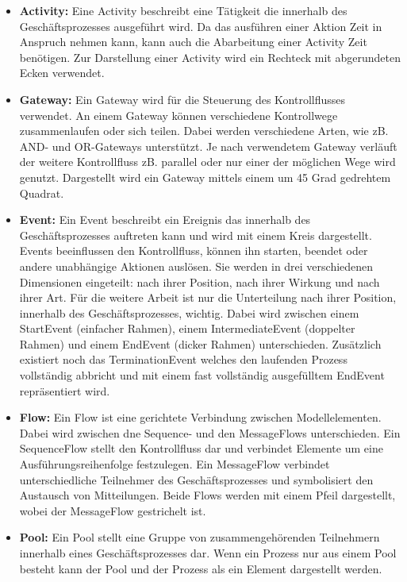 \begin{itemize}
    \item \textbf{Activity:} 
    Eine Activity beschreibt eine Tätigkeit die innerhalb des Geschäftsprozesses ausgeführt wird.
    Da das ausführen einer Aktion Zeit in Anspruch nehmen kann, kann auch die Abarbeitung einer Activity Zeit benötigen.
    Zur Darstellung einer Activity wird ein Rechteck mit abgerundeten Ecken verwendet.
    \item \textbf{Gateway:}
    Ein Gateway wird für die Steuerung des Kontrollflusses verwendet. 
    An einem Gateway können verschiedene Kontrollwege zusammenlaufen oder sich teilen. 
    Dabei werden verschiedene Arten, wie zB. AND- und OR-Gateways unterstützt. 
    Je nach verwendetem Gateway verläuft der weitere Kontrollfluss zB. parallel oder nur einer der möglichen Wege wird genutzt.
    Dargestellt wird ein Gateway mittels einem um 45 Grad gedrehtem Quadrat. 
    \item \textbf{Event:}
    Ein Event beschreibt ein Ereignis das innerhalb des Geschäftsprozesses auftreten kann und wird mit einem Kreis dargestellt.
    Events beeinflussen den Kontrollfluss, können ihn starten, beendet oder andere unabhängige Aktionen auslösen.
    Sie werden in drei verschiedenen Dimensionen eingeteilt: nach ihrer Position, nach ihrer Wirkung und nach ihrer Art.
    Für die weitere Arbeit ist nur die Unterteilung nach ihrer Position, innerhalb des Geschäftsprozesses, wichtig.
    Dabei wird zwischen einem StartEvent (einfacher Rahmen), einem IntermediateEvent (doppelter Rahmen) und einem EndEvent (dicker Rahmen) unterschieden.
    Zusätzlich existiert noch das TerminationEvent welches den laufenden Prozess vollständig abbricht und mit einem fast vollständig ausgefülltem EndEvent repräsentiert wird.
    \item \textbf{Flow:}
    Ein Flow ist eine gerichtete Verbindung zwischen Modellelementen.
    Dabei wird zwischen dne Sequence- und den MessageFlows unterschieden.
    Ein SequenceFlow stellt den Kontrollfluss dar und verbindet Elemente um eine Ausführungsreihenfolge festzulegen.
    Ein MessageFlow verbindet unterschiedliche Teilnehmer des Geschäftsprozesses und symbolisiert den Austausch von Mitteilungen.
    Beide Flows werden mit einem Pfeil dargestellt, wobei der MessageFlow gestrichelt ist.
    \item \textbf{Pool:}
    Ein Pool stellt eine Gruppe von zusammengehörenden Teilnehmern innerhalb eines Geschäftsprozesses dar.
    Wenn ein Prozess nur aus einem Pool besteht kann der Pool und der Prozess als ein Element dargestellt werden.

\end{itemize}
